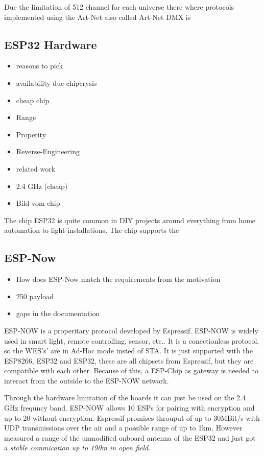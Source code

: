 \documentclass[]{ccs-thesis}
\begin{document}
Due the limitation of 512 channel for each universe there where protocols implemented using the 
Art-Net also called Art-Net DMX is 

\subsection{ESP32 Hardware}
\begin{itemize}
\item reasons to pick
\item availability due chipcrysis
\item cheap chip
\item Range
\item Properity
\item Reverse-Engineering 
\item related work
\item 2.4 GHz (cheap)
\item Bild vom chip
\end{itemize}
The chip ESP32 is quite common in DIY projects around everything from home automation to light installations. The chip supports the 

\subsection{ESP-Now}
\label{sub:ESP-Now}
\begin{itemize}
\item How does ESP-Now match the requirements from the motivation
\item 250 payload
\item gaps in the documentation
\end{itemize}

ESP-NOW is a properitary protocol developed by Espressif. 
ESP-NOW is widely used in smart light, remote controlling, sensor, etc.. 
It is a conectionless protocol, so the \ac{WES}'s' are in Ad-Hoc mode insted of \ac{STA}.
It is just supported with the ESP8266, ESP32 and ESP32, these are all chipsets from Espressif, but they are compatible with each other.
Because of this, a ESP-Chip as gateway is needed to interact from the outside to the ESP-NOW network. 

Through the hardware limitation of the boards it can just be used on the 2.4 GHz frequncy band.
ESP-NOW allows 10 ESPs for pairing with encryption and up to 20 without encryption.
Espressif promises throuput of up to 30MBit/s with UDP transmissions over the air and a possible range of up to 1km.
However \emph{\textcite{ESPNOWPaper}} measured a range of the unmodified onboard antenna of the ESP32 
and just got a \emph{\textcite{ESPNOWPaper} stable commication up to 190m in open field}.\\
\end{document}
